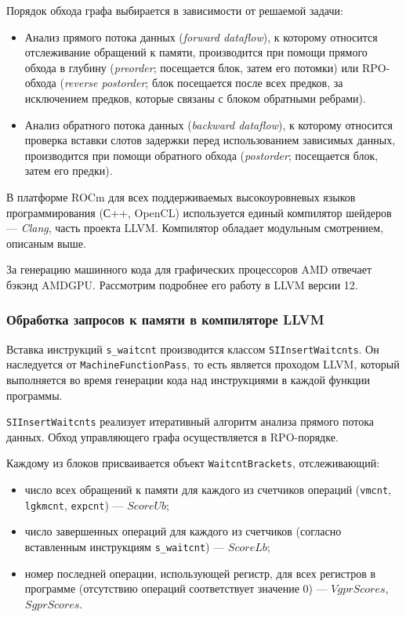 \documentclass[a4paper,14pt]{extarticle}
\newenvironment{ul}{\begin{itemize}[noitemsep,topsep=0em]}{\end{itemize}\vspace{4mm}}
\begin{document}
Порядок обхода графа выбирается в зависимости от решаемой задачи:
\begin{ul}
\item Анализ прямого потока данных (\textit{forward dataflow}), к которому относится отслеживание обращений
  к памяти, производится при помощи прямого обхода в глубину (\textit{preorder}; посещается блок, затем его потомки) или RPO-обхода (\textit{reverse postorder}; блок посещается после всех предков, за исключением предков, которые связаны с блоком обратными ребрами).

\item Анализ обратного потока данных (\textit{backward dataflow}), к которому относится проверка вставки
слотов задержки перед использованием зависимых данных, производится при помощи обратного обхода
(\textit{postorder}; посещается блок, затем его предки).
\end{ul}

В платформе ROCm для всех поддерживаемых высокоуровневых языков программирования (С++, OpenCL)
используется единый компилятор шейдеров — \textit{Clang}, часть проекта LLVM.
Компилятор обладает модульным смотрением, описаным выше.

За генерацию машинного кода для графических процессоров AMD отвечает бэкэнд AMDGPU.
Рассмотрим подробнее его работу в LLVM версии 12\cite{llvm-12}.

\subsubsection{Обработка запросов к памяти в компиляторе LLVM}

Вставка инструкций \texttt{s\_waitcnt} производится классом \texttt{SIInsertWaitcnts}.
Он наследуется от \texttt{MachineFunctionPass}, то есть является проходом LLVM,
который выполняется во время генерации кода над инструкциями в каждой функции программы.

\texttt{SIInsertWaitcnts} реализует итеративный алгоритм анализа прямого потока данных.
Обход управляющего графа осуществляется в RPO-порядке.

Каждому из блоков присваивается объект \texttt{WaitcntBrackets}, отслеживающий:
\begin{ul}
\item число всех обращений к памяти для каждого из счетчиков операций
  (\texttt{vmcnt}, \texttt{lgkmcnt}, \texttt{expcnt}) — $ScoreUb$;
\item число завершенных операций для каждого из счетчиков (согласно
  вставленным инструкциям \texttt{s\_waitcnt}) — $ScoreLb$;
\item номер последней операции, использующей регистр, для всех регистров
  в программе (отсутствию операций соответствует значение $0$) — $VgprScores$, $SgprScores$.
\end{ul}
\end{document}
